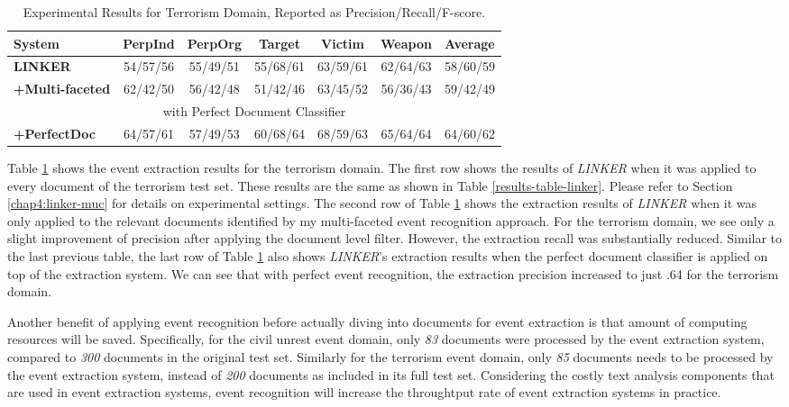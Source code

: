 \begin{table}[t]
\footnotesize
\centering
\begin{tabular}[center]{|l|ccccc|c|} \hline
{\bf System} & {\bf PerpInd} & {\bf PerpOrg} & {\bf Target} & {\bf Victim} &
{\bf Weapon}  & {\bf Average} \\ \hline
{\bf LINKER} & 54/57/56 & 55/49/51 & 55/68/61 & 63/59/61 & 62/64/63 & 58/60/59 \\ \hline
{\bf +Multi-faceted} & 62/42/50 & 56/42/48 & 51/42/46 & 63/45/52 & 56/36/43 & 59/42/49 \\ \hline
\multicolumn{7}{|c|}{with Perfect Document Classifier} \\ \hline
{\bf +PerfectDoc} & 64/57/61 & 57/49/53 & 60/68/64 & 68/59/63 & 65/64/64 & 64/60/62 \\ \hline %
\end{tabular}
\caption{Experimental Results for Terrorism Domain, Reported as
  Precision/Recall/F-score.}
\label{results-table-linker-filtered}
\end{table}


Table \ref{results-table-linker-filtered} 
shows the event extraction results for the terrorism domain.
The first row shows the results of {\it LINKER} 
when it was applied to every document of the terrorism test set. 
These results are the same as shown in Table \ref{results-table-linker}.
Please refer to 
Section \ref{chap4:linker-muc} 
for details on experimental settings. 
The second row of Table \ref{results-table-linker-filtered} 
shows the extraction results of {\it LINKER} 
when it was only applied to the relevant documents 
identified 
by my multi-faceted event recognition approach. 
For the terrorism domain, we 
see only a slight improvement of precision 
after applying the document level filter. 
However, 
the extraction recall was 
substantially reduced.
Similar to the 
last 
previous table, the last row of Table \ref{results-table-linker-filtered} 
also shows {\it LINKER}'s extraction results when 
the perfect document classifier is applied on top of the extraction system.
We can see that with perfect event recognition, the extraction precision 
increased to just .64 for the terrorism domain.

Another benefit of applying event recognition before actually diving into 
documents for event extraction is that amount of computing resources will be 
saved. Specifically, for the civil unrest event domain, 
only {\it 83} documents were processed by the event extraction system, 
compared to {\it 300} documents in the original test set. 
Similarly for the terrorism event domain, only {\it 85} documents 
needs to be processed by the event extraction system,
instead of {\it 200} documents as included in its full test set.
Considering the costly text analysis components that are used in event extraction systems, 
event recognition will 
increase the throughtput rate of event extraction systems in practice.



